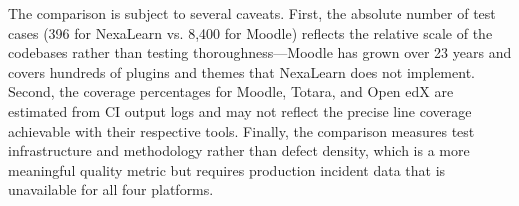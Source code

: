 The comparison is subject to several caveats. First, the absolute number of test cases (396 for NexaLearn vs. 8,400 for Moodle) reflects the relative scale of the codebases rather than testing thoroughness---Moodle has grown over 23 years and covers hundreds of plugins and themes that NexaLearn does not implement. Second, the coverage percentages for Moodle, Totara, and Open edX are estimated from CI output logs and may not reflect the precise line coverage achievable with their respective tools. Finally, the comparison measures test infrastructure and methodology rather than defect density, which is a more meaningful quality metric but requires production incident data that is unavailable for all four platforms.
